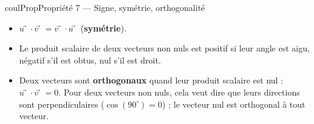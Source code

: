 \documentclass[11pt,a4paper]{article}
\makeatletter
\newcounter{lycee@signet}
\newcommand{\signet}[3][]{\stepcounter{lycee@signet}%
  \edef\lycee@dest{\if\relax\detokenize{#1}\relax
    signet.\arabic{lycee@signet}\else#1\fi}%
  \hypertarget{\lycee@dest}{}\bookmark[level=#2,dest=\lycee@dest]{#3}}
\def\vec#1{#1⃗}}%
\newenvironment{proprietebox}[1][Propriété]%
  {\begin{boitecours}[phantom={\signet{2}{#1}}]{coulProp}{#1}}{\end{boitecours}}
\makeatother
\begin{document}
\begin{proprietebox}[Propriété 7 --- Signe, symétrie, orthogonalité]
\begin{itemize}
  \item $\vec{u}\cdot\vec{v}=\vec{v}\cdot\vec{u}$ (\textbf{symétrie}).
  \item Le produit scalaire de deux vecteurs non nuls est positif si leur angle est
        aigu, négatif s'il est obtus, nul s'il est droit.
  \item Deux vecteurs sont \textbf{orthogonaux} quand leur produit scalaire est nul :
        $\vec{u}\cdot\vec{v}=0$. Pour deux vecteurs non nuls, cela veut dire que leurs
        directions sont perpendiculaires ($\cos(90^{\circ})=0$) ; le vecteur nul est
        orthogonal à tout vecteur.
\end{itemize}
\end{proprietebox}
\end{document}
